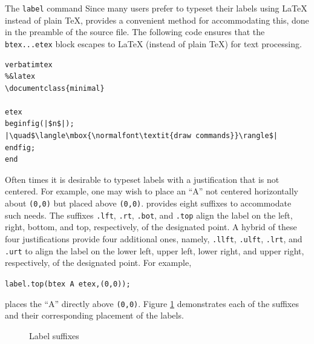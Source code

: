 \begin{subsection}{The \texttt{label} command}
Since many \MP{} users prefer to typeset their labels using \LaTeX{} instead of plain \TeX, \MP{} provides a convenient method for accommodating this, done in the preamble of the \MP{} source file.  The following code ensures that the \verb|btex...etex| block escapes to \LaTeX{} (instead of plain \TeX) for text processing.
\begin{lstlisting}[xleftmargin=56bp]
verbatimtex
%&latex
\documentclass{minimal}

etex
beginfig(|$n$|);
|\quad$\langle\mbox{\normalfont\textit{draw commands}}\rangle$|
endfig;
end
\end{lstlisting}

Often times it is desirable to typeset labels with a justification that is not centered.  For example, one may wish to place an ``A'' not centered horizontally about \texttt{(0,0)} but placed above \texttt{(0,0)}. \MP{} provides eight suffixes to accommodate such needs.  The suffixes \texttt{.lft}, \texttt{.rt}, \texttt{.bot}, and \texttt{.top} align the label on the left, right, bottom, and top, respectively, of the designated point.  A hybrid of these four justifications provide four additional ones, namely, \texttt{.llft}, \texttt{.ulft}, \texttt{.lrt}, and \texttt{.urt} to align the label on the lower left, upper left, lower right, and upper right, respectively, of the designated point.  For example, \begin{center}\verb|label.top(btex A etex,(0,0));|\end{center} places the ``A'' directly above \texttt{(0,0)}.  Figure \ref{fig:label} demonstrates each of the suffixes and their corresponding placement of the labels.
\begin{figure}[ht]
	\begin{center}\hfill{}\hfill{}\hfill\mbox{}\end{center}
	\caption{Label suffixes}\label{fig:label}
\end{figure}

\end{subsection}
